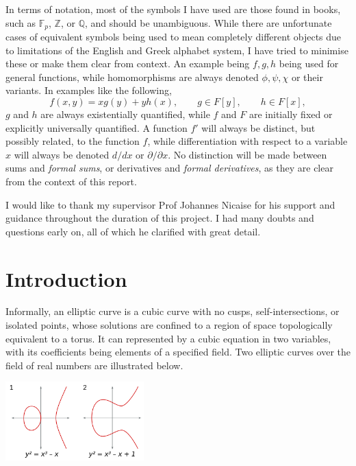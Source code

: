 \documentclass{article}
\newcommand{\F}{\mathbb{F}}
\newcommand{\Z}{\mathbb{Z}}
\newcommand{\Q}{\mathbb{Q}}
\newcommand{\rb}[1]{\left( #1 \right)}
\renewcommand{\sb}[1]{\left[ #1 \right]}
\theoremstyle{definition}\newtheorem*{definition}{Definition}
\theoremstyle{definition}\newtheorem*{example}{Example}
\theoremstyle{definition}\newtheorem*{remark}{Remark}
\begin{document}
In terms of notation, most of the symbols I have used are those found in books, such as $ \F_p $, $ \Z $, or $ \Q $, and should be unambiguous. While there are unfortunate cases of equivalent symbols being used to mean completely different objects due to limitations of the English and Greek alphabet system, I have tried to minimise these or make them clear from context. An example being $ f, g, h $ being used for general functions, while homomorphisms are always denoted $ \phi, \psi, \chi $ or their variants. In examples like the following,
$$ f\rb{x, y} = xg\rb{y} + yh\rb{x}, \qquad g \in F\sb{y}, \qquad h \in F\sb{x}, $$
$ g $ and $ h $ are always existentially quantified, while $ f $ and $ F $ are initially fixed or explicitly universally quantified. A function $ f' $ will always be distinct, but possibly related, to the function $ f $, while differentiation with respect to a variable $ x $ will always be denoted $ d / dx $ or $ \partial / \partial x $. No distinction will be made between sums and \emph{formal sums}, or derivatives and \emph{formal derivatives}, as they are clear from the context of this report.

I would like to thank my supervisor Prof Johannes Nicaise for his support and guidance throughout the duration of this project. I had many doubts and questions early on, all of which he clarified with great detail.

\pagebreak

\section{Introduction}

Informally, an elliptic curve is a cubic curve with no cusps, self-intersections, or isolated points, whose solutions are confined to a region of space topologically equivalent to a torus. It can represented by a cubic equation in two variables, with its coefficients being elements of a specified field. Two elliptic curves over the field of real numbers are illustrated below.

\begin{center}
\includegraphics*[width=0.4\textwidth]{img/ECClines-3.png}
\end{center}
\end{document}
